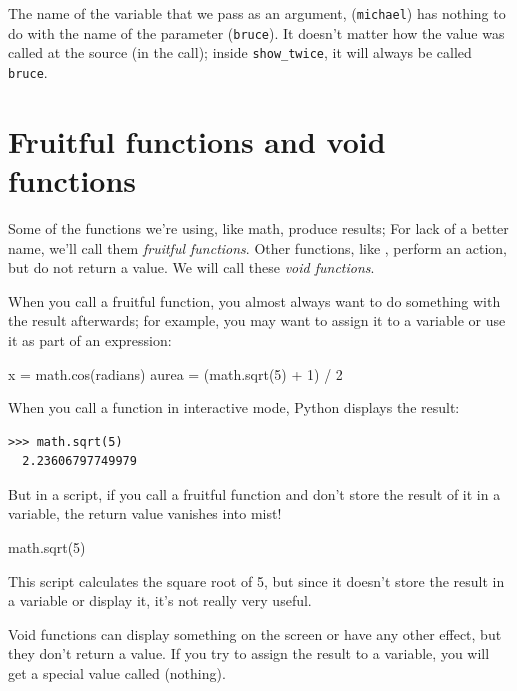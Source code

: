 The name of the variable that we pass as an argument, (\texttt{michael}) has nothing to do with the name of the parameter (\texttt{bruce}). It doesn't matter how the value was called at the source (in the call); inside \texttt{show\_twice}, it will always be called \texttt{bruce}.

\hypertarget{funciones-productivas-y-funciones-estuxe9riles}{%
\section{Fruitful functions and void functions}\label{funciones-productivas-y-funciones-estuxe9riles}}

 
 

Some of the functions we're using, like math, produce results; For lack of a better name, we'll call them \emph{fruitful functions}. Other functions, like , perform an action, but do not return a value. We will call these \emph{void functions}.

When you call a fruitful function, you almost always want to do something with the result afterwards; for example, you may want to assign it to a variable or use it as part of an expression:

\begin{python}[frame=single]
x = math.cos(radians)
aurea = (math.sqrt(5) + 1) / 2
\end{python}

When you call a function in interactive mode, Python displays the result:

\begin{Verbatim}[frame=single]
>>> math.sqrt(5)
  2.23606797749979
\end{Verbatim}

But in a script, if you call a fruitful function and don't store the result of it in a variable, the return value vanishes into mist!

\begin{python}[frame=single]
math.sqrt(5)
\end{python}

This script calculates the square root of 5, but since it doesn't store the result in a variable or display it, it's not really very useful.

 

Void functions can display something on the screen or have any other effect, but they don't return a value. If you try to assign the result to a variable, you will get a special value called  (nothing).

